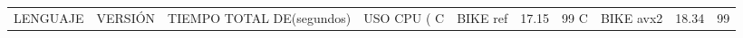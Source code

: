 \begin{tabular}{llrrr}
\toprule
LENGUAJE &   VERSIÓN & TIEMPO TOTAL DE (segundos) & USO CPU (%
\midrule
       C &  BIKE ref &                                 17.15 &         99%
       C & BIKE avx2 &                                 18.34 &         99%
\bottomrule
\end{tabular}
